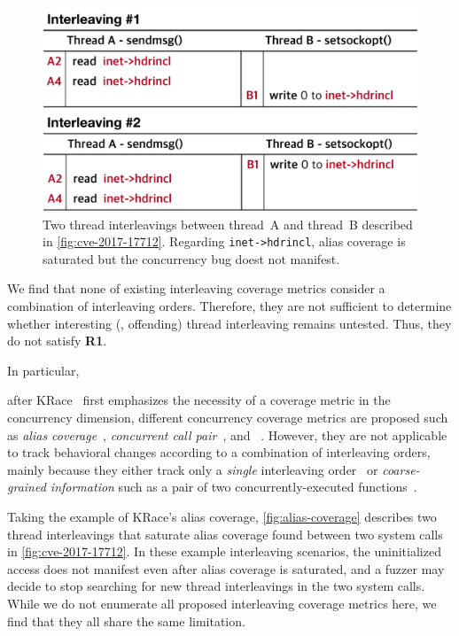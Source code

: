 %
\begin{figure}[t]
  \centering
  \includegraphics[width=0.95\linewidth]{fig/alias-coverage.pdf}
  \caption{Two thread interleavings between thread~A and thread~B
    described in \autoref{fig:cve-2017-17712}. Regarding
    \texttt{inet->hdrincl}, alias coverage is saturated but the
    concurrency bug doest not manifest.}
  \label{fig:alias-coverage}
\end{figure}
%
We find that none of existing interleaving coverage metrics consider
a combination of interleaving orders.
%
Therefore, they are not sufficient to determine whether interesting
(\ie, offending) thread interleaving remains untested. Thus, they do
not satisfy \textbf{R1}.


In particular,


after KRace~\cite{krace} first emphasizes the necessity
of a coverage metric in the concurrency dimension, different
concurrency coverage metrics are proposed such as \textit{alias
  coverage}~\cite{krace}, \textit{concurrent call
  pair}~\cite{conzzer}, and \textit{}~\cite{muzz}.
%
However, they are not applicable to track behavioral changes according
to a combination of interleaving orders, mainly because they either
track only a \textit{single} interleaving order~\cite{krace, muzz} or
\textit{coarse-grained information} such as a pair of two
concurrently-executed functions~\cite{conzzer}.

Taking the example of KRace's alias coverage,
\autoref{fig:alias-coverage} describes two thread interleavings that
saturate alias coverage found between two system calls in
\autoref{fig:cve-2017-17712}.
%
In these example interleaving scenarios, the uninitialized access does
not manifest even after alias coverage is saturated, and a fuzzer may
decide to stop searching for new thread interleavings in the two
system calls.
%
While we do not enumerate all proposed interleaving coverage metrics
here, we find that they all share the same limitation.


